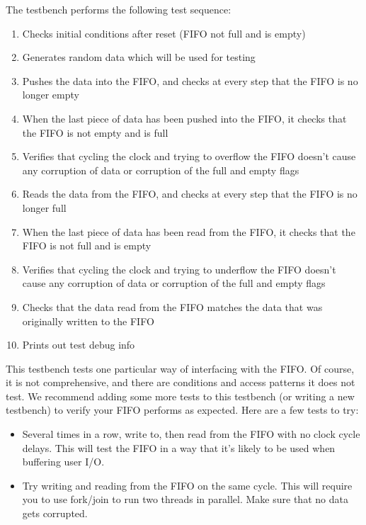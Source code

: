 \documentclass[11pt]{article}
\begin{document}
The testbench performs the following test sequence:
\begin{enumerate}
    \item Checks initial conditions after reset (FIFO not full and is empty)
    \item Generates random data which will be used for testing
    \item Pushes the data into the FIFO, and checks at every step that the FIFO is no longer empty
    \item When the last piece of data has been pushed into the FIFO, it checks that the FIFO is not empty and is full
    \item Verifies that cycling the clock and trying to overflow the FIFO doesn't cause any corruption of data or corruption of the full and empty flags
    \item Reads the data from the FIFO, and checks at every step that the FIFO is no longer full
    \item When the last piece of data has been read from the FIFO, it checks that the FIFO is not full and is empty
    \item Verifies that cycling the clock and trying to underflow the FIFO doesn't cause any corruption of data or corruption of the full and empty flags
    \item Checks that the data read from the FIFO matches the data that was originally written to the FIFO
    \item Prints out test debug info
\end{enumerate}

This testbench tests one particular way of interfacing with the FIFO.
Of course, it is not comprehensive, and there are conditions and access patterns it does not test.
We recommend adding some more tests to this testbench (or writing a new testbench) to verify your FIFO performs as expected. Here are a few tests to try:

\begin{itemize}
    \item Several times in a row, write to, then read from the FIFO with no clock cycle delays.
      This will test the FIFO in a way that it's likely to be used when buffering user I/O.

    \item Try writing and reading from the FIFO on the same cycle.
      This will require you to use fork/join to run two threads in parallel.
      Make sure that no data gets corrupted.
\end{itemize}
\end{document}
